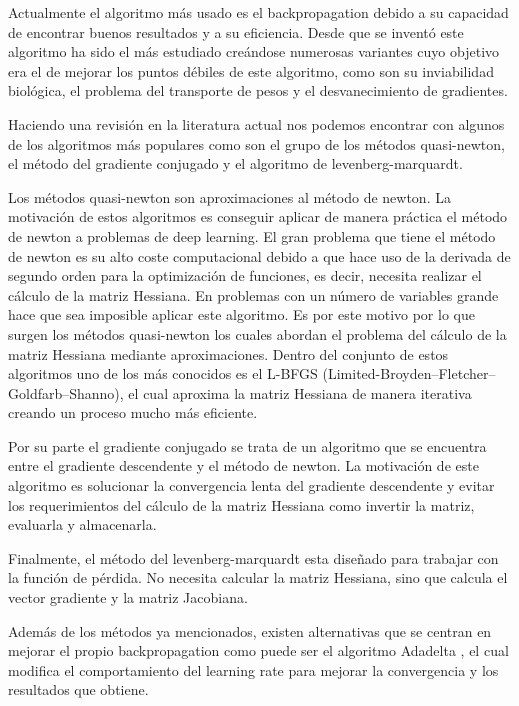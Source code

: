 Actualmente el algoritmo más usado es el backpropagation \cite{RefWorks:RefID:6-rumelhart1986learning} debido a su capacidad de encontrar buenos resultados y a su eficiencia. Desde que se inventó este algoritmo ha sido el más estudiado creándose numerosas variantes cuyo objetivo era el de mejorar los puntos débiles de este algoritmo, como son su inviabilidad biológica, el problema del transporte de pesos \cite{RefWorks:RefID:10-grossberg1987competitive} y el desvanecimiento de gradientes.

Haciendo una revisión en la literatura actual nos podemos encontrar con algunos de los algoritmos más populares como son el grupo de los métodos quasi-newton, el método del gradiente conjugado\cite{RefWorks:RefID:13-johansson1991backpropagation} y el algoritmo de levenberg-marquardt\cite{yu2011levenberg}.

Los métodos quasi-newton son aproximaciones al método de newton. La motivación de estos algoritmos es conseguir aplicar de manera práctica el método de newton a problemas de deep learning. El gran problema que tiene el método de newton es su alto coste computacional debido a que hace uso de la derivada de segundo orden para la optimización de funciones, es decir, necesita realizar el cálculo de la matriz Hessiana. En problemas con un número de variables grande hace que sea imposible aplicar este algoritmo. Es por este motivo por lo que surgen los métodos quasi-newton los cuales abordan el problema del cálculo de la matriz Hessiana mediante aproximaciones. Dentro del conjunto de estos algoritmos uno de los más conocidos es el L-BFGS \cite{RefWorks:RefID:12-rafati2018improving} (Limited-Broyden–Fletcher–Goldfarb–Shanno), el cual aproxima la matriz Hessiana de manera iterativa creando un proceso mucho más eficiente. 

Por su parte el gradiente conjugado  se trata de un algoritmo que se encuentra entre el gradiente descendente y el método de newton. La motivación de este algoritmo es solucionar la convergencia lenta del gradiente descendente y evitar los requerimientos del cálculo de la matriz Hessiana como invertir la matriz, evaluarla y almacenarla. 

Finalmente, el método del levenberg-marquardt esta diseñado para trabajar con la función de pérdida. No necesita calcular la matriz Hessiana, sino que calcula el vector gradiente y la matriz Jacobiana.

Además de los métodos ya mencionados, existen alternativas que se centran en mejorar el propio backpropagation como puede ser el algoritmo Adadelta \cite{https://doi.org/10.48550/arxiv.1212.5701}, el cual modifica el comportamiento del learning rate para mejorar la convergencia y los resultados que obtiene. 

